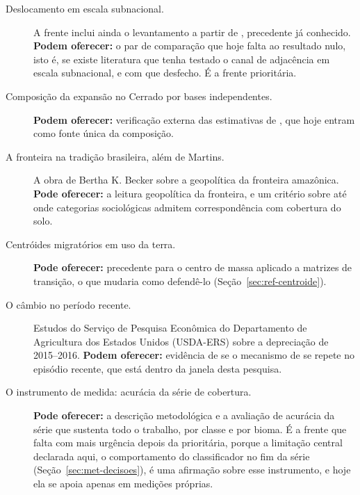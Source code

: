 \begin{description}
\item[Deslocamento em escala subnacional.]\leavevmode
{}
A frente inclui ainda o levantamento a partir de ,
precedente já conhecido.
\textbf{Podem oferecer:} o par de comparação que hoje falta ao resultado nulo,
isto é, se existe literatura que tenha testado o canal de adjacência em escala
subnacional, e com que desfecho. É a frente prioritária.

\item[Composição da expansão no Cerrado por bases independentes.]\leavevmode
{}
\textbf{Podem oferecer:} verificação externa das estimativas de
, que hoje entram como fonte única da
composição.

\item[A fronteira na tradição brasileira, além de Martins.] A obra de Bertha
K. Becker sobre a geopolítica da fronteira amazônica.
\textbf{Pode oferecer:} a leitura geopolítica da fronteira, e um critério
sobre até onde categorias sociológicas admitem correspondência com cobertura
do solo.

\item[Centróides migratórios em uso da terra.] \textbf{Pode oferecer:}
precedente para o centro de massa aplicado a matrizes de transição, o que
mudaria como defendê-lo (Seção~\ref{sec:ref-centroide}).

\item[O câmbio no período recente.] Estudos do Serviço de Pesquisa Econômica
do Departamento de Agricultura dos Estados Unidos (USDA-ERS) sobre a
depreciação de 2015--2016. \textbf{Podem oferecer:} evidência de se o mecanismo de
 se repete no episódio recente, que está dentro da
janela desta pesquisa.

\item[O instrumento de medida: acurácia da série de cobertura.]\leavevmode
{}
\textbf{Pode oferecer:} a descrição metodológica e a avaliação de acurácia da
série que sustenta todo o trabalho, por classe e por bioma. É a frente que
falta com mais urgência depois da prioritária, porque a limitação central
declarada aqui, o comportamento do classificador no fim da série
(Seção~\ref{sec:met-decisoes}), é uma afirmação sobre esse instrumento, e
hoje ela se apoia apenas em medições próprias.


\end{description}
